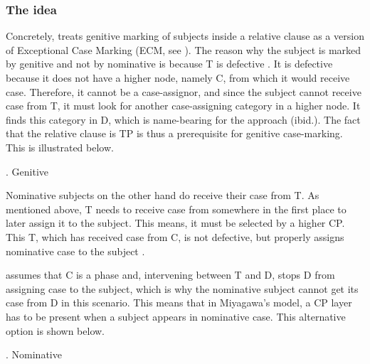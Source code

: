 \documentclass [output=book,colorlinks,citecolor=brown]{langscibook}
\begin{document}
\subsubsection{The idea}

Concretely, \citet{miyagawa:2011:genitive, miyagawa:2012:case, miyagawa:2017:agreement} treats genitive marking of subjects inside a relative clause as a version of Exceptional Case Marking (ECM, see \citealt{chomsky:1986:barriers, chomsky:2001:derivation}). The reason why the subject is marked by genitive and not by nominative is because T is defective \citep[1271]{miyagawa:2011:genitive}. It is defective because it does not have a higher node, namely C, from which it would receive case. Therefore, it cannot be a case-assignor, and since the subject cannot receive case from T, it must look for another case-assigning category in a higher node. It finds this category in D, which is name-bearing for the approach (ibid.). The fact that the relative clause is TP is thus a prerequisite for genitive case-marking. This is illustrated below. %

\ex. Genitive \citep[147]{miyagawa:2017:agreement}\\

Nominative subjects on the other hand do receive their case from T. As mentioned above, T needs to receive case from somewhere in the first place to later assign it to the subject. This means, it must be selected by a higher CP. This T, which has received case from C, is not defective, but properly assigns nominative case to the subject \citep[1271]{miyagawa:2011:genitive}.

\citet[1271–1272]{miyagawa:2011:genitive} assumes that C is a phase and, intervening between T and D, stops D from assigning case to the subject, which is why the nominative subject cannot get its case from D in this scenario. This means that in Miyagawa's model, a CP layer has to be present when a subject appears in nominative case. This alternative option is shown below.

\newpage

\ex. Nominative \citep[147]{miyagawa:2017:agreement}\\
\end{document}
